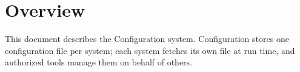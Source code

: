 \documentclass[a4paper]{arrowhead}
\begin{document}
\sloppy

\ArrowheadSetup

\begin{center}
  \vspace*{1cm}
  \huge{\arrowtitle}

  \vspace*{0.2cm}
  \LARGE{\arrowtype}
  \vspace*{1cm}

  \vspace*{\fill}


  \vspace*{1cm}
  \vspace*{\fill}

  \begin{abstract}
    This document describes the Configuration support system of the Eclipse Arrowhead 5.2.2 framework, as implemented in \texttt{ah5-Configuration-java-spring} of the primary Java source tree (\texttt{Eclipse-Arrowhead-java}) and deployed with the standalone Compose definition of that folder.
  \end{abstract}

  \vspace*{1cm}
\end{center}

\newpage

\tableofcontents
\newpage

\section{Overview}
\label{sec:overview}

This document describes the Configuration system. Configuration stores one configuration file per system; each system fetches its own file at run time, and authorized tools manage them on behalf of others.
\end{document}
